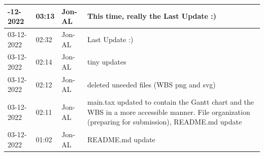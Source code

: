 \documentclass[11pt]{article}
\begin{document}
\begin{center}
\begin{longtable}{|p{2cm}|l|p{2cm}|p{10.5cm}|}
            \hline \hline
            \endlastfoot
            03-12-2022                                 & 03:13                              & Jon-AL                                  & This time, really the Last Update :)                                                                                                                                                                                                                                                                         \\ \hline
            03-12-2022                                 & 02:32                              & Jon-AL                                  & Last Update :)                                                                                                                                                                                                                                                                                               \\ \hline
            03-12-2022                                 & 02:14                              & Jon-AL                                  & tiny updates                                                                                                                                                                                                                                                                                                 \\ \hline
            03-12-2022                                 & 02:12                              & Jon-AL                                  & deleted uneeded files (WBS png and svg)                                                                                                                                                                                                                                                                      \\ \hline
            03-12-2022                                 & 02:11                              & Jon-AL                                  & main.tax updated to contain the Gantt chart and the WBS in a more accessible manner. File organization (preparing for submission), README.md update                                                                                                                                                          \\ \hline
            03-12-2022                                 & 01:02                              & Jon-AL                                  & README.md update                                                                                                                                                                                                                                                                                             \\ \hline

\end{longtable}
\end{center}
\end{document}
